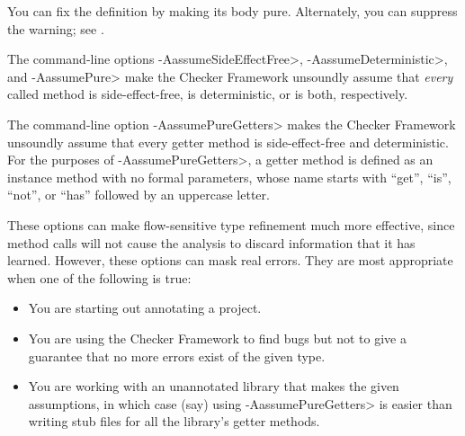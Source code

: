 \noindent
You can fix the definition by making its body pure.  Alternately, you can
suppress the warning; see .



The command-line options \<-AassumeSideEffectFree>,
\<-AassumeDeterministic>, and \<-AassumePure> make the Checker Framework
unsoundly assume that \emph{every} called method is side-effect-free, is
deterministic, or is both, respectively.

The command-line option \<-AassumePureGetters> makes the Checker Framework
unsoundly assume that every getter method is side-effect-free and
deterministic.  For the purposes of \<-AassumePureGetters>, a getter method
is defined as an instance method with no formal parameters, whose name
starts with ``get'', ``is'', ``not'', or ``has'' followed by an uppercase
letter.

These options can make
flow-sensitive type refinement much more effective, since method calls will
not cause the analysis to discard information that it has learned.
However, these options can mask real errors.  They are most appropriate when one
of the following is true:
\begin{itemize}
\item
  You are starting out annotating a project.
\item
  You are using the Checker Framework to find bugs but not to give a
  guarantee that no more errors exist of the given type.
\item
  You are working with an unannotated library that makes the given
  assumptions, in which case (say) using \<-AassumePureGetters> is easier
  than writing stub files for all the library's getter methods.
\end{itemize}


